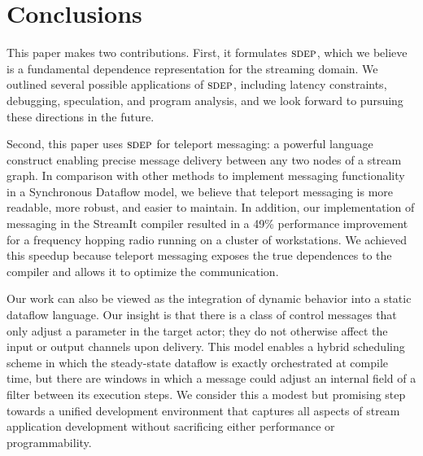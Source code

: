 \section{Conclusions}
\label{sec:conclusion}

This paper makes two contributions.  First, it formulates $\textsc{sdep}$,
which we believe is a fundamental dependence representation for the
streaming domain.  We outlined several possible applications of
$\textsc{sdep}$, including latency constraints, debugging, speculation, and
program analysis, and we look forward to pursuing these directions in
the future.

Second, this paper uses $\textsc{sdep}$ for teleport messaging: a powerful
language construct enabling precise message delivery between any two
nodes of a stream graph.  In comparison with other methods to
implement messaging functionality in a Synchronous Dataflow model, we
believe that teleport messaging is more readable, more robust, and
easier to maintain.  In addition, our implementation of messaging in
the StreamIt compiler resulted in a 49\% performance improvement for a
frequency hopping radio running on a cluster of workstations.  We
achieved this speedup because teleport messaging exposes the true
dependences to the compiler and allows it to optimize the
communication.

Our work can also be viewed as the integration of dynamic behavior
into a static dataflow language.  Our insight is that there is a class
of control messages that only adjust a parameter in the target actor;
they do not otherwise affect the input or output channels upon
delivery.  This model enables a hybrid scheduling scheme in which the
steady-state dataflow is exactly orchestrated at compile time, but
there are windows in which a message could adjust an internal field of
a filter between its execution steps.  We consider this a modest
but promising step towards a unified development environment that
captures all aspects of stream application development without
sacrificing either performance or programmability.
